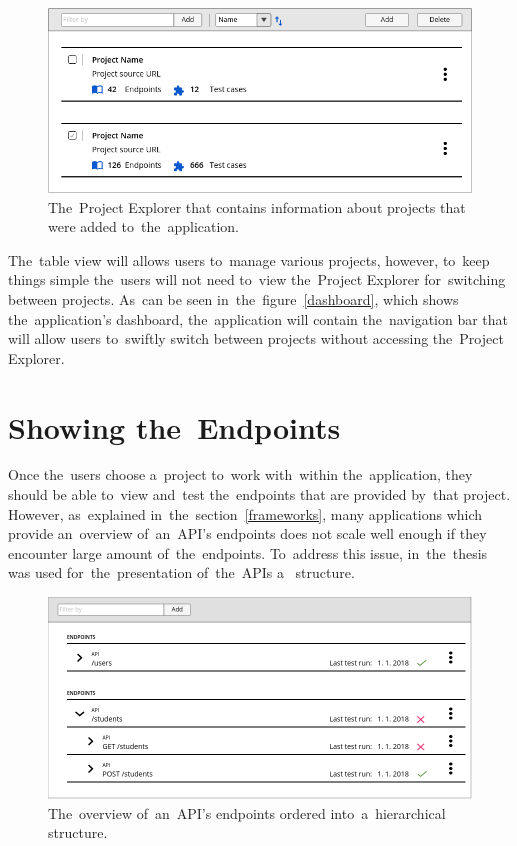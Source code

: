 \begin{figure}[!hbt]
	\centering
	\includegraphics[scale=0.4]{./designs/drafts-1.0/project-explorer.png}
	\caption{The~Project Explorer that contains information about projects that
	were added to~the~application.}
	\label{projectExplorer}
\end{figure}

The~table view will allows users to~manage various projects, however, to~keep
things simple the~users will not need to~view the~Project Explorer for~switching
between projects. As~can be seen in~the~figure~\ref{dashboard}, which shows
the~application's dashboard, the~application will contain the~navigation bar
that will allow users to~swiftly switch between projects without accessing
the~Project Explorer.

\section{Showing the~Endpoints}
Once the~users choose a~project to~work with~within the~application, they should
be able to~view and~test the~endpoints that are provided by~that project.
However, as~explained in~the~section~\ref{frameworks}, many applications which
provide an~overview of~an~API's endpoints does not scale well enough if they
encounter large amount of~the~endpoints. To~address this issue, in~the~thesis
was used for~the~presentation of~the~APIs a~ structure.

\begin{figure}[!hbt]
	\centering
	\includegraphics[scale=0.4]{./designs/drafts-1.0/api-general.png}
	\caption{The~overview of~an~API's endpoints ordered into~a~hierarchical
	 structure.}
	\label{api-general}
\end{figure}

